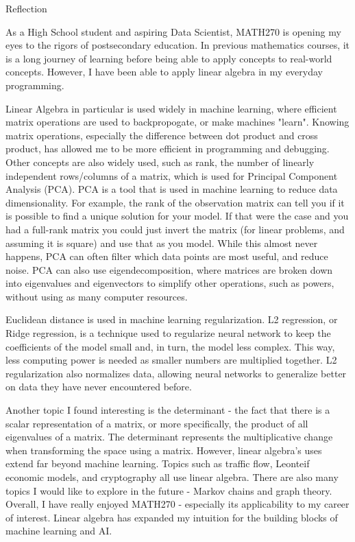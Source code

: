 \documentclass[12pt, letterpaper, twoside]{article}
\begin{document}
\noindent Reflection

\vspace{0.3cm}
\noindent As a High School student and aspiring Data Scientist, MATH270 is opening my eyes to the rigors of postsecondary education.
In previous mathematics courses, it is a long journey of learning before being able to apply concepts to real-world concepts. 
However, I have been able to apply linear algebra in my everyday programming.

\vspace{0.3cm}
\noindent Linear Algebra in particular is used widely in machine learning, where efficient matrix operations are used to backpropogate, or make machines "learn".
Knowing matrix operations, especially the difference between dot product and cross product, has allowed me to be more efficient in programming and debugging.
Other concepts are also widely used, such as rank, the number of linearly independent rows/columns of a matrix, which is used for Principal Component Analysis (PCA).
PCA is a tool that is used in machine learning to reduce data dimensionality.
For example, the rank of the observation matrix can tell you if it is possible to find a unique solution for your model. 
If that were the case and you had a full-rank matrix you could just invert the matrix (for linear problems, and assuming it is square) and use that as you model.
While this almost never happens, PCA can often filter which data points are most useful, and reduce noise. 
PCA can also use eigendecomposition, where matrices are broken down into eigenvalues and eigenvectors to simplify other operations, such as powers, without using as many computer resources.

\vspace{0.3cm}
\noindent Euclidean distance is used in machine learning regularization. 
L2 regression, or Ridge regression, is a technique used to regularize neural network to keep the coefficients of the model small and, in turn, the model less complex.
This way, less computing power is needed as smaller numbers are multiplied together.
L2 regularization also normalizes data, allowing neural networks to generalize better on data they have never encountered before.

\vspace{0.3cm}
\noindent Another topic I found interesting is the determinant - the fact that there is a scalar representation of a matrix, or more specifically, the product of all eigenvalues of a matrix. 
The determinant represents the multiplicative change when transforming the space using a matrix.
However, linear algebra's uses extend far beyond machine learning.
Topics such as traffic flow, Leonteif economic models, and cryptography all use linear algebra.
There are also many topics I would like to explore in the future - Markov chains and graph theory.
Overall, I have really enjoyed MATH270 - especially its applicability to my career of interest.
Linear algebra has expanded my intuition for the building blocks of machine learning and AI.
\end{document}
